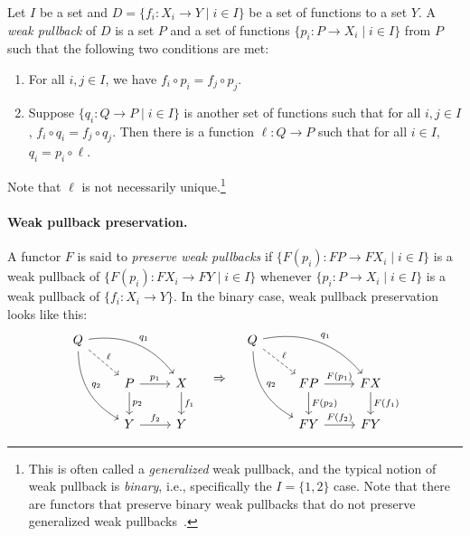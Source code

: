 \documentclass[orivec,envcountsect,envcountsame]{llncs}
\begin{document}
\begin{definition}

	Let \(I\) be a set and \(D = \{f_i \colon X_i \to Y \mid i \in I\}\) be a set of functions to a set \(Y\).
	A \emph{weak pullback} of \(D\) is a set \(P\) and a set of functions \(\{p_i \colon P \to X_i \mid i \in I\}\) from \(P\) such that the following two conditions are met:
	\begin{enumerate}
		\item For all \(i, j \in I\), we have \(f_i \circ p_i = f_j \circ p_j\).
		\item Suppose \(\{q_i \colon Q \to P \mid i \in I\}\) is another set of functions such that for all \(i,j \in I\), \(f_i \circ q_i = f_j \circ q_j\).
		Then there is a function \(\ell \colon Q \to P\) such that for all \(i \in I\), \(q_i = p_i \circ \ell\).
	\end{enumerate}
	Note that \(\ell\) is not necessarily unique.\footnote{This is often called a \emph{generalized} weak pullback, and the typical notion of weak pullback is \emph{binary}, i.e., specifically the \(I = \{1, 2\}\) case. Note that there are functors that preserve binary weak pullbacks that do not preserve generalized weak pullbacks~\cite{gumm}.}

	\paragraph{Weak pullback preservation.} A functor \(F\) is said to \emph{preserve weak pullbacks} if \(\{F(p_i) \colon FP \to FX_i \mid i \in I\}\) is a weak pullback of \(\{F(p_i) \colon FX_i \to FY \mid i \in I\}\) whenever \(\{p_i \colon P \to X_i \mid i \in I\}\) is a weak pullback of \(\{f_i \colon X_i \to Y\}\).
	In the binary case, weak pullback preservation looks like this:
	\[
		\begin{tikzcd}
			Q \ar[dr, dashed, "\ell"] \ar[drr, "q_1", bend left] \ar[ddr, "q_2", bend right] & \\
			& P \ar[r, "p_1"] \ar[d, "p_2"] & X \ar[d, "f_1"] \\
			& Y \ar[r, "f_2"] & Y
		\end{tikzcd}
		\quad\Rightarrow\quad
		\begin{tikzcd}
			Q \ar[dr, dashed, "\ell"] \ar[drr, "q_1", bend left] \ar[ddr, "q_2", bend right] & \\
			& FP \ar[r, "F(p_1)"] \ar[d, "F(p_2)"] & FX \ar[d, "F(f_1)"] \\
			& FY \ar[r, "F(f_2)"] & FY
		\end{tikzcd}
	\]


\end{definition}
\end{document}
